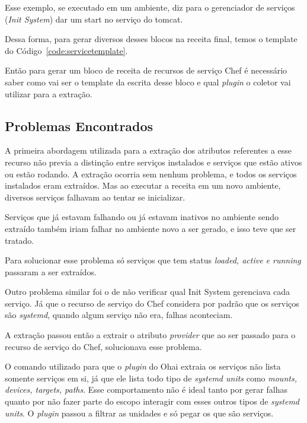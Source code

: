 Esse exemplo, se executado em um ambiente, diz para o
gerenciador de serviços (\textit{Init System}) dar um start no serviço do tomcat.

Dessa forma, para gerar diversos desses blocos na receita final, temos o template
do Código~\ref{code:servicetemplate}.

\noindent\begin{minipage}{\textwidth}
  \lstset{style=shell}
  
\end{minipage}\hfill

Então para gerar um bloco de receita de recursos de serviço Chef é necessário
saber como vai ser o template da escrita desse bloco e qual \textit{plugin} o
coletor vai utilizar para a extração.

\subsection{Problemas Encontrados}

A primeira abordagem utilizada para a extração dos atributos referentes a esse
recurso não previa a distinção entre serviços instalados e serviços que estão
ativos ou estão rodando. A extração ocorria sem nenhum problema, e todos os serviços
instalados eram extraídos. Mas ao executar a receita em um novo ambiente, diversos
serviços falhavam ao tentar se inicializar.

Serviços que já estavam falhando ou já estavam inativos no ambiente sendo extraído
também iriam falhar no ambiente novo a ser gerado, e isso teve que ser tratado.


Para solucionar esse problema só serviços que tem status \textit{loaded, active e running}
passaram a ser extraídos.\

Outro problema similar foi o de não verificar qual Init System gerenciava cada
serviço. Já que o recurso de serviço do Chef considera por padrão que os serviços
são \textit{systemd}, quando algum serviço não era, falhas aconteciam.

A extração passou então a extrair o atributo \textit{provider} que ao ser passado
para o recurso de serviço do Chef, solucionava esse problema.

O comando utilizado para que o \textit{plugin} do Ohai extraia os serviços não
lista somente serviços em si, já que ele lista todo tipo de \textit{systemd units}
como \textit{mounts, devices, targets, paths}. Esse comportamento não é ideal
tanto por gerar falhas quanto por não fazer parte do escopo interagir com esses
outros tipos de \textit{systemd units}. O \textit{plugin} passou a filtrar as
unidades e só pegar os que são serviços.
